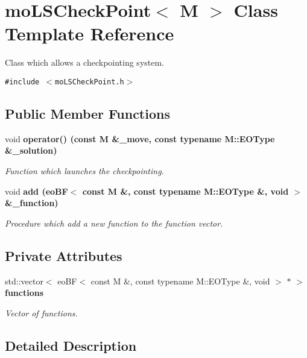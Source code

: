\section{mo\-LSCheck\-Point$<$ M $>$ Class Template Reference}
\label{classmo_l_s_check_point}
Class which allows a checkpointing system.  


{\tt \#include $<$mo\-LSCheck\-Point.h$>$}

\subsection*{Public Member Functions}
\begin{CompactItemize}
\item 
void \bf{operator()} (const M \&\_\-move, const typename M::EOType \&\_\-solution)
\begin{CompactList}\small\item\em Function which launches the checkpointing. \item\end{CompactList}\item 
void \bf{add} (eo\-BF$<$ const M \&, const typename M::EOType \&, void $>$ \&\_\-function)
\begin{CompactList}\small\item\em Procedure which add a new function to the function vector. \item\end{CompactList}\end{CompactItemize}
\subsection*{Private Attributes}
\begin{CompactItemize}
\item 
std::vector$<$ eo\-BF$<$ const M \&, const typename M::EOType \&, void $>$ $\ast$ $>$ \bf{functions}\label{classmo_l_s_check_point_56a7427a6aebac7955c22bab302c050a}

\begin{CompactList}\small\item\em Vector of functions. \item\end{CompactList}\end{CompactItemize}


\subsection{Detailed Description}
